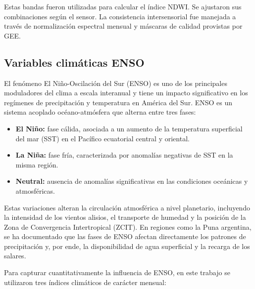 Estas bandas fueron utilizadas para calcular el índice NDWI. Se ajustaron sus combinaciones según el sensor. La consistencia intersensorial fue manejada a través de normalización espectral mensual y máscaras de calidad provistas por GEE.

\subsection*{Variables climáticas ENSO}

El fenómeno El Niño-Oscilación del Sur (ENSO) es uno de los principales moduladores del clima a escala interanual y tiene un impacto significativo en los regímenes de precipitación y temperatura en América del Sur. ENSO es un sistema acoplado océano-atmósfera que alterna entre tres fases:

\begin{itemize}
    \item \textbf{El Niño:} fase cálida, asociada a un aumento de la temperatura superficial del mar (SST) en el Pacífico ecuatorial central y oriental.
    \item \textbf{La Niña:} fase fría, caracterizada por anomalías negativas de SST en la misma región.
    \item \textbf{Neutral:} ausencia de anomalías significativas en las condiciones oceánicas y atmosféricas.
\end{itemize}

Estas variaciones alteran la circulación atmosférica a nivel planetario, incluyendo la intensidad de los vientos alisios, el transporte de humedad y la posición de la Zona de Convergencia Intertropical (ZCIT). En regiones como la Puna argentina, se ha documentado que las fases de ENSO afectan directamente los patrones de precipitación y, por ende, la disponibilidad de agua superficial y la recarga de los salares.

Para capturar cuantitativamente la influencia de ENSO, en este trabajo se utilizaron tres índices climáticos de carácter mensual:


